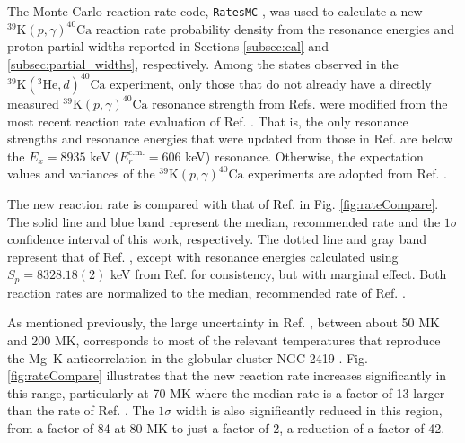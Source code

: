 The Monte Carlo reaction rate code, \texttt{RatesMC} \cite{Longland2010a,RatesMC}, was used to calculate a new $^{39}\mathrm{K}(p, \gamma)^{40}\mathrm{Ca}$ reaction rate probability density from the resonance energies and proton partial-widths reported in Sections \ref{subsec:cal} and \ref{subsec:partial_widths}, respectively. Among the states observed in the $^{39}\mathrm{K}(^{3}\mathrm{He},d)^{40}\mathrm{Ca}$ experiment, only those that do not already have a directly measured $^{39}\mathrm{K}(p, \gamma)^{40}\mathrm{Ca}$ resonance strength from Refs. \cite{Kikstra1990,Cheng1981,Leenhouts1966} were modified from the most recent reaction rate evaluation of Ref. \cite{Longland2018}. That is, the only resonance strengths and resonance energies that were updated from those in Ref. \cite{Longland2018} are below the $E_{x} = 8935$ keV ($E^{\mathrm{c.m.}}_{r} = 606$ keV) resonance. Otherwise, the expectation values and variances of the $^{39}\mathrm{K}(p, \gamma)^{40}\mathrm{Ca}$ experiments \cite{Kikstra1990,Cheng1981,Leenhouts1966} are adopted from Ref. \cite{Longland2018}.


The new reaction rate is compared with that of Ref. \cite{Longland2018} in Fig. \ref{fig:rateCompare}. The solid line and blue band represent the median, recommended rate and the $1\sigma$ confidence interval of this work, respectively. The dotted line and gray band represent that of Ref. \cite{Longland2018}, except with resonance energies calculated using $S_{p} = 8328.18(2)$ keV from Ref. \cite{Wang2021} for consistency, but with marginal effect. Both reaction rates are normalized to the median, recommended rate of Ref. \cite{Longland2018}. %

As mentioned previously, the large uncertainty in Ref. \cite{Longland2018}, between about 50 MK and 200 MK, corresponds to most of the relevant temperatures that reproduce the Mg--K anticorrelation in the globular cluster NGC 2419 \cite{Iliadis2016}. 
Fig. \ref{fig:rateCompare} illustrates that the new reaction rate increases significantly in this range, particularly at 70 MK where the median rate is a factor of 13 larger than the rate of Ref. \cite{Longland2018}. The $1\sigma$ width is also significantly reduced in this region, from a factor of 84 at 80 MK to just a factor of 2, a reduction of a factor of 42.

